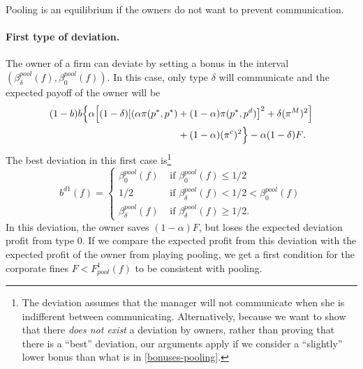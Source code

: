\documentclass[]{article}
\begin{document}
Pooling is an equilibrium if the owners do not want to prevent communication. 
\paragraph{First type of deviation.} 
The owner of a firm can deviate by setting a bonus in the interval  $(\beta^{pool}_\delta(f),\beta^{pool}_0(f))$. In this case, only type $\delta$ will communicate and the expected payoff of the owner will be
\begin{align}\label{pool-owners-first-dev}
(1-b)b \Big\{ \alpha \Big[
(1-\delta)[(\alpha \pi(p^*,p^*)&+(1-\alpha)\pi(p^*,p^d)\big]^2 +\delta (\pi^M)^2\Big]\\
 &+ (1-\alpha) (\pi^c)^2\Big\} - \alpha (1-\delta)F \text{.} \notag
\end{align}
The best deviation in this first case is\footnote{\label{ft:rmk-discrete}%
The deviation assumes that the manager will not communicate when she is indifferent between communicating. Alternatively, because we want to show that there \emph{does not exist} a deviation by owners, rather than proving that there is a ``best'' deviation, our arguments apply if we consider a ``slightly'' lower bonus than what is in \eqref{bonuses-pooling}. %
}
\begin{equation}\label{[pool_dev_1}
b^{d1}(f) = 
\begin{cases}
\beta^{pool}_0(f) & \text{ if }\beta^{pool}_0(f) \leq  1/2 \\         
1/2 & \text{ if }\beta^{pool}_\delta(f) <  1/2 <  \beta^{pool}_0(f) \\
\beta^{pool}_\delta(f) & \text{ if }\beta^{pool}_\delta(f)\geq1/2.
\end{cases}
\end{equation}
In this deviation, the owner saves $(1-\alpha)F$, but loses the expected deviation profit from type $0$. If we compare the expected profit from this deviation with the expected profit of the owner from playing pooling, we get a first condition for the corporate fines $F<{F}_{pool}^1(f)$ to be consistent with pooling.
\end{document}
